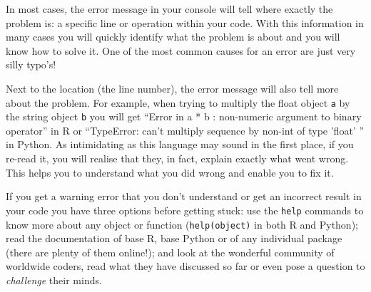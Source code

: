 In most cases, the error message in your console will tell where exactly the problem is: a specific line or operation within your code. With this information in many cases you will quickly identify what the problem is about and you will know how to solve it. One of the most common causes for an error are just very silly typo's!

Next to the location (the line number), the error message will also tell more about the problem. For example, when trying to multiply the float object \texttt{a} by the string object \texttt{b} you will get ``Error in a * b : non-numeric argument to binary operator'' in R or ``TypeError: can't multiply sequence by non-int of type 'float' '' in Python. As intimidating as this language may sound in the first place, if you re-read it, you will realise that they, in fact, explain exactly what went wrong. This helps you to understand what you did wrong and enable you to fix it. 




If you get a warning error that you don't understand or get an incorrect result in your code you have three options before getting stuck: use the \texttt{help} commands to know more about any object or function (\verb|help(object)| in both R and  Python); read the documentation of base R, base Python or of any individual package (there are plenty of them online!); and look at the wonderful community of worldwide coders, read what they have discussed so far or even pose a question to \textit{challenge} their minds.


